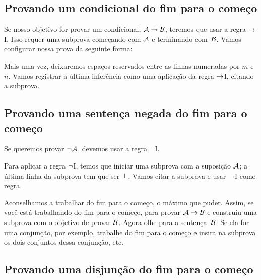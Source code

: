 \subsection*{Provando um condicional do fim para o come\c co}

Se nosso objetivo for provar um condicional,  $\mathcal{A} \rightarrow \mathcal{B}$, teremos que usar a regra $\rightarrow$I. Isso requer uma subprova come\c cando com $\mathcal{A}$ e terminando com~$\mathcal{B}$. Vamos configurar nossa prova da seguinte forma:
\begin{fitchproof}
\open
{}
\ellipsesline 
{}
\close
{}
\end{fitchproof} 
Mais uma vez, deixaremos espa\c cos reservados entre as  linhas numeradas por $m$ e $n$. Vamos registrar a \'ultima infer\^encia como uma aplica\c c\~ao da regra $\rightarrow$I, citando a subprova.

\subsection*{Provando uma senten\c ca negada do fim para o come\c co}

Se queremos provar $\neg \mathcal{A}$, devemos usar a regra $\neg$I.
\begin{fitchproof}
\open
{}
\ellipsesline 
{}
\close
{}
\end{fitchproof} 
Para aplicar a regra $\neg$I, temos que iniciar uma subprova com a suposi\c c\~ao $\mathcal{A}$; a \'ultima linha da subprova tem que ser $\bot$.  Vamos citar a subprova e usar~$\neg$I como regra.  

Aconselhamos a trabalhar do fim para o come\c co,  o m\'aximo que puder. Assim, se voc\^e est\'a trabalhando do fim para o come\c co, para provar $\mathcal{A} \rightarrow \mathcal{B}$ e construiu uma subprova com o objetivo de  provar $\mathcal{B}$. Agora olhe para a senten\c ca~$\mathcal{B}$. Se ela for uma conjun\c c\~ao, por exemplo, trabalhe do fim para o come\c co e insira na subprova os dois conjuntos dessa conjun\c c\~ao,  etc.


\subsection*{Provando uma  disjun\c c\~ao do fim para o come\c co}

